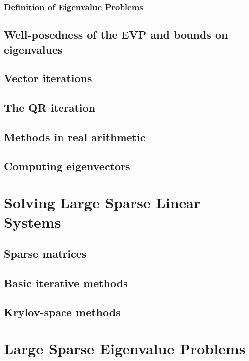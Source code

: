 \subsection{Definition of Eigenvalue Problems}

\section{Well-posedness of the EVP and bounds on eigenvalues}


\section{Vector iterations}


\section{The QR iteration}


\section{Methods in real arithmetic}


\section{Computing eigenvectors}
%

\chapter{Solving Large Sparse Linear Systems}
\label{chap:sparse}

\section{Sparse matrices}



\section{Basic iterative methods}


\section{Krylov-space methods}


\chapter{Large Sparse Eigenvalue Problems}
\label{chap:sparse-eigen}

